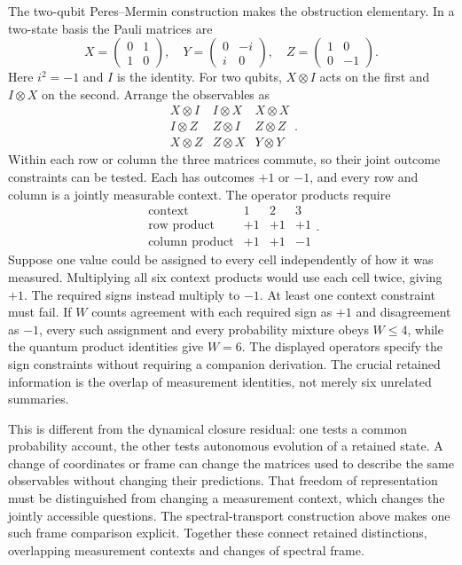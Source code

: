 The two-qubit Peres--Mermin construction makes the obstruction elementary. In a two-state basis the Pauli matrices are
\[
 X=\begin{pmatrix}0&1\\1&0\end{pmatrix},\quad
 Y=\begin{pmatrix}0&-i\\i&0\end{pmatrix},\quad
 Z=\begin{pmatrix}1&0\\0&-1\end{pmatrix}.
\]
Here $i^2=-1$ and $I$ is the identity. For two qubits, $X\otimes I$ acts on the first and $I\otimes X$ on the second. Arrange the observables as
\[
 \begin{array}{ccc}
 X\otimes I&I\otimes X&X\otimes X\\
 I\otimes Z&Z\otimes I&Z\otimes Z\\
 X\otimes Z&Z\otimes X&Y\otimes Y
 \end{array}.
\]
Within each row or column the three matrices commute, so their joint outcome constraints can be tested.  Each has outcomes $+1$ or $-1$, and every row and column is a jointly measurable context. The operator products require
\[
 \begin{array}{c|ccc}
 \text{context}&1&2&3\\ \hline
 \text{row product}&+1&+1&+1\\
 \text{column product}&+1&+1&-1
 \end{array}.
\]
Suppose one value could be assigned to every cell independently of how it was measured. Multiplying all six context products would use each cell twice, giving $+1$. The required signs instead multiply to $-1$. At least one context constraint must fail. If $W$ counts agreement with each required sign as $+1$ and disagreement as $-1$, every such assignment and every probability mixture obeys $W\le4$, while the quantum product identities give $W=6$. The displayed operators specify the sign constraints without requiring a companion derivation. The crucial retained information is the overlap of measurement identities, not merely six unrelated summaries.

This is different from the dynamical closure residual: one tests a common probability account, the other tests autonomous evolution of a retained state. A change of coordinates or frame can change the matrices used to describe the same observables without changing their predictions. That freedom of representation must be distinguished from changing a measurement context, which changes the jointly accessible questions. The spectral-transport construction above makes one such frame comparison explicit. Together these connect retained distinctions, overlapping measurement contexts and changes of spectral frame.

